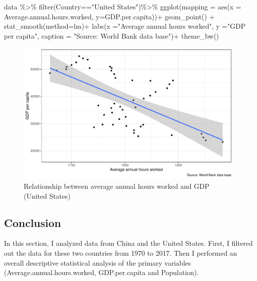 \documentclass[11pt,a4paper,]{article}
\newenvironment{Shaded}{\begin{snugshade}}{\end{snugshade}}
\newcommand{\AttributeTok}[1]{\textcolor[rgb]{0.77,0.63,0.00}{#1}}
\newcommand{\FunctionTok}[1]{\textcolor[rgb]{0.00,0.00,0.00}{#1}}
\newcommand{\NormalTok}[1]{#1}
\newcommand{\SpecialCharTok}[1]{\textcolor[rgb]{0.00,0.00,0.00}{#1}}
\newcommand{\StringTok}[1]{\textcolor[rgb]{0.31,0.60,0.02}{#1}}
\begin{document}
\begin{Shaded}
\begin{Highlighting}[]
\NormalTok{data }\SpecialCharTok{\%\textgreater{}\%}
    \FunctionTok{filter}\NormalTok{(Country}\SpecialCharTok{==}\StringTok{"United States"}\NormalTok{)}\SpecialCharTok{\%\textgreater{}\%}
    \FunctionTok{ggplot}\NormalTok{(}\AttributeTok{mapping =} \FunctionTok{aes}\NormalTok{(}\AttributeTok{x =}\NormalTok{ Average.annual.hours.worked,}
                          \AttributeTok{y=}\NormalTok{GDP.per.capita))}\SpecialCharTok{+}
    \FunctionTok{geom\_point}\NormalTok{() }\SpecialCharTok{+} 
    \FunctionTok{stat\_smooth}\NormalTok{(}\AttributeTok{method=}\NormalTok{lm)}\SpecialCharTok{+}
  \FunctionTok{labs}\NormalTok{(}\AttributeTok{x =}\StringTok{"Average annual hours worked"}\NormalTok{, }
       \AttributeTok{y =}\StringTok{"GDP per capita"}\NormalTok{, }
       \AttributeTok{caption =} \StringTok{"Source: World Bank data base"}\NormalTok{)}\SpecialCharTok{+}
    \FunctionTok{theme\_bw}\NormalTok{()}
\end{Highlighting}
\end{Shaded}

\begin{figure}
\centering
\includegraphics{report_files/figure-latex/Figure4-1.pdf}
\caption{\label{fig:Figure4}Relationship between average annual hours worked and GDP (United States)}
\end{figure}

\hypertarget{conclusion}{%
\subsection{Conclusion}\label{conclusion}}

In this section, I analyzed data from China and the United States. First, I filtered out the data for these two countries from 1970 to 2017. Then I performed an overall descriptive statistical analysis of the primary variables (Average.annual.hours.worked, GDP.per.capita and Population).
\end{document}
